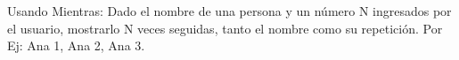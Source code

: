 ﻿
Usando Mientras: Dado el nombre de una persona y un número N ingresados por el usuario, mostrarlo N veces seguidas, tanto el nombre como su repetición. Por Ej: Ana 1, Ana 2, Ana 3.


\newpage
{}

\volverindice
\newpage

